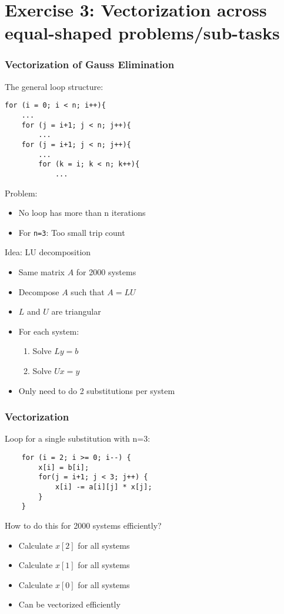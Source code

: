 \section{Exercise 3: Vectorization across equal-shaped problems/sub-tasks}
\begin{frame}[fragile]
\frametitle{Vectorization of Gauss Elimination}
The general loop structure:
\codestylec
\begin{lstlisting}
for (i = 0; i < n; i++){
    ...
    for (j = i+1; j < n; j++){
        ...
    for (j = i+1; j < n; j++){
        ...
        for (k = i; k < n; k++){
            ...                   
\end{lstlisting}
Problem:
\begin{itemize}
\item No loop has more than n iterations
\item For \texttt{n=3}: Too small trip count
\end{itemize}
\end{frame}

\begin{frame}{Idea: LU decomposition}
\begin{itemize}
\item Same matrix $A$ for 2000 systems
\item Decompose $A$ such that $A = LU$
\item $L$ and $U$ are triangular
\item For each system:
	\begin{enumerate}
	\item Solve $Ly = b$
	\item Solve $Ux = y$
	\end{enumerate}
\item Only need to do 2 substitutions per system
\end{itemize}
\end{frame}

\begin{frame}[fragile]
\frametitle{Vectorization}
Loop for a single substitution with n=3:
\codestylec
\begin{lstlisting}
    for (i = 2; i >= 0; i--) {
        x[i] = b[i];
        for(j = i+1; j < 3; j++) {
            x[i] -= a[i][j] * x[j];
        }
    }                  
\end{lstlisting}
How to do this for 2000 systems efficiently?
\begin{itemize}
\item Calculate $x[2]$ for all systems
\item Calculate $x[1]$ for all systems
\item Calculate $x[0]$ for all systems
\item Can be vectorized efficiently
\end{itemize}
\end{frame}

